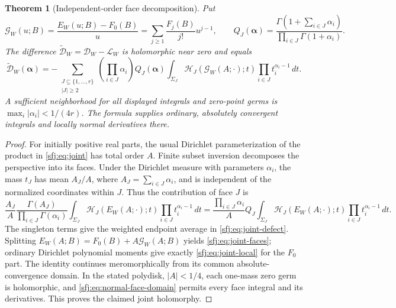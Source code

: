 \documentclass[11pt,letterpaper]{article}
\numberwithin{equation}{section}
\newtheorem{theorem}{Theorem}[section]
\theoremstyle{definition}
\theoremstyle{remark}
\begin{document}
\begin{theorem}[Independent-order face decomposition]
\label{sfj:thm:joint-faces}
Put
\[
 \mathcal G_W(u;B)=\frac{E_W(u;B)-F_0(B)}u
       =\sum_{j\ge1}\frac{F_j(B)}{j!}u^{j-1},
 \qquad
 Q_J(\boldsymbol\alpha)=
 \frac{\Gamma(1+\sum_{i\in J}\alpha_i)}
                      {\prod_{i\in J}\Gamma(1+\alpha_i)}.
\]
The difference $\widetilde{\mathscr D}_W=
\mathscr D_W-\mathscr L_W$ is holomorphic near zero and equals
\begin{equation}\label{sfj:eq:joint-faces}
 \boxed{\displaystyle
 \widetilde{\mathscr D}_W(\boldsymbol\alpha)
   =-\sum_{\substack{J\subseteq\{1,\ldots,r\}\\|J|\ge2}}
       \left(\prod_{i\in J}\alpha_i\right)Q_J(\boldsymbol\alpha)
       \int_{\Sigma_J}\mathcal H_J(\mathcal G_W(A;\cdot);t)
                              \prod_{i\in J}t_i^{\alpha_i-1}\,dt.}
\end{equation}
A sufficient neighborhood for all displayed integrals and zero-point
germs is $\max_i|\alpha_i|<1/(4r)$.  The formula supplies ordinary,
absolutely convergent integrals and locally normal derivatives there.
\end{theorem}

\begin{proof}
For initially positive real parts, the usual Dirichlet parameterization
of the product in \eqref{sfj:eq:joint} has total order $A$.
Finite subset inversion decomposes the perspective into its faces.
Under the Dirichlet measure with parameters $\alpha_i$, the mass
$t_J$ has mean $A_J/A$, where $A_J=\sum_{i\in J}\alpha_i$, and
is independent of the normalized coordinates within $J$.  Thus the
contribution of face $J$ is
\[
 \frac{A_J}{A}\frac{\Gamma(A_J)}{\prod_{i\in J}\Gamma(\alpha_i)}
 \int_{\Sigma_J}\mathcal H_J(E_W(A;\cdot);t)
                                         \prod_{i\in J}t_i^{\alpha_i-1}\,dt
 =\frac{\prod_{i\in J}\alpha_i}{A}Q_J
                    \int_{\Sigma_J}\mathcal H_J(E_W(A;\cdot);t)
                                         \prod_{i\in J}t_i^{\alpha_i-1}\,dt.
\]
The singleton terms give the weighted endpoint average in
\eqref{sfj:eq:joint-defect}.  Splitting $E_W(A;B)=F_0(B)+
A\mathcal G_W(A;B)$ yields \eqref{sfj:eq:joint-faces}; ordinary
Dirichlet polynomial moments give exactly \eqref{sfj:eq:joint-local}
for the $F_0$ part.  The identity continues meromorphically from its
common absolute-convergence domain.  In the stated polydisk,
$|A|<1/4$, each one-mass zero germ is holomorphic, and
\eqref{sfj:eq:normal-face-domain} permits every face integral and
its derivatives.  This proves the claimed joint holomorphy.
\end{proof}
\end{document}
